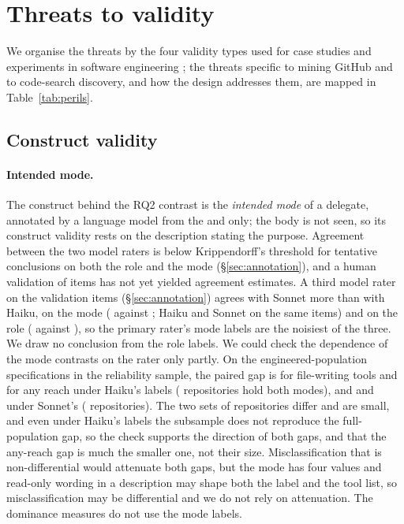 
\section{Threats to validity}
\label{sec:threats}

We organise the threats by the four validity types used for case studies and experiments in software engineering
\citep{runeson2009guidelines,wohlin2012experimentation}; the threats specific to mining GitHub and to code-search
discovery, and how the design addresses them, are mapped in Table~\ref{tab:perils}.

\subsection{Construct validity}

\paragraph{Intended mode.} The construct behind the RQ2 contrast is the \emph{intended mode} of a delegate, annotated by
a language model from the  and  only; the body is not seen, so its construct validity
rests on the description stating the purpose. Agreement between the two model raters is below Krippendorff's threshold for
tentative conclusions on both the role and the mode (\S\ref{sec:annotation}), and a human
validation of \nHumanSample{} items has not yet yielded agreement estimates. A third model rater on the \nOpusItems{} validation items
(\S\ref{sec:annotation}) agrees with Sonnet more than with Haiku, on the mode (\alphaOpusModeSonnet{} against
\alphaOpusModeHaiku{}; Haiku and Sonnet \alphaKitModeHaikuSonnet{} on the same items) and on the role
(\alphaOpusRoleSonnet{} against \alphaOpusRoleHaiku{}), so the primary rater's mode labels are the noisiest of the
three. We draw no conclusion from the role labels. We could check the dependence of the mode contrasts on the rater
only partly. On the \nRaterSensSpecs{} engineered-population specifications in the reliability sample, the paired gap
is \RaterSensGapWriteHaiku{} for file-writing tools and \RaterSensGapAuthorityHaiku{} for any reach under Haiku's
labels (\RaterSensReposHaiku{} repositories hold both modes), and \RaterSensGapWriteSonnet{} and
\RaterSensGapAuthoritySonnet{} under Sonnet's (\RaterSensReposSonnet{} repositories). The two sets of repositories
differ and are small, and even under Haiku's labels the subsample does not reproduce the full-population gap, so the
check supports the direction of both gaps, and that the any-reach gap is much the smaller one, not their size. Misclassification that
is non-differential would attenuate both gaps, but the mode has four values and read-only wording in a description may
shape both the label and the tool list, so misclassification may be differential and we do not rely on attenuation.
The dominance measures do not use the mode labels.

